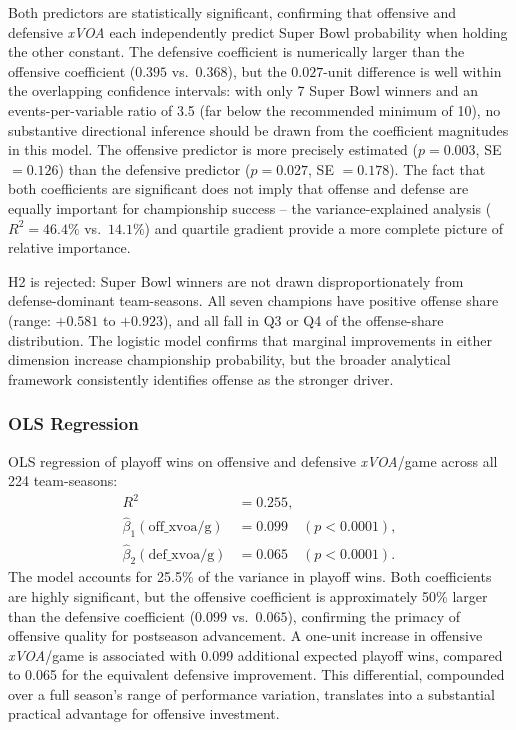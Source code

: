 \documentclass[12pt,a4paper]{article}
\newcommand{\xvoa}{\textit{xVOA}}
\begin{document}
Both predictors are statistically significant, confirming that offensive and defensive \xvoa{} each independently predict Super Bowl probability when holding the other constant. The defensive coefficient is numerically larger than the offensive coefficient ($0.395$ vs.\ $0.368$), but the $0.027$-unit difference is well within the overlapping confidence intervals: with only 7 Super Bowl winners and an events-per-variable ratio of 3.5 (far below the recommended minimum of 10), no substantive directional inference should be drawn from the coefficient magnitudes in this model. The offensive predictor is more precisely estimated ($p = 0.003$, SE $= 0.126$) than the defensive predictor ($p = 0.027$, SE $= 0.178$). The fact that both coefficients are significant does not imply that offense and defense are equally important for championship success -- the variance-explained analysis ($R^2 = 46.4\%$ vs.\ $14.1\%$) and quartile gradient provide a more complete picture of relative importance.

H2 is rejected: Super Bowl winners are not drawn disproportionately from defense-dominant team-seasons. All seven champions have positive offense share (range: $+0.581$ to $+0.923$), and all fall in Q3 or Q4 of the offense-share distribution. The logistic model confirms that marginal improvements in either dimension increase championship probability, but the broader analytical framework consistently identifies offense as the stronger driver.

\subsubsection{OLS Regression}

OLS regression of playoff wins on offensive and defensive \xvoa{}/game across all 224 team-seasons:
\begin{align*}
  R^2 &= 0.255, \\
  \hat{\beta}_1(\text{off\_xvoa/g}) &= 0.099 \quad (p < 0.0001), \\
  \hat{\beta}_2(\text{def\_xvoa/g}) &= 0.065 \quad (p < 0.0001).
\end{align*}
The model accounts for 25.5\% of the variance in playoff wins. Both coefficients are highly significant, but the offensive coefficient is approximately 50\% larger than the defensive coefficient ($0.099$ vs.\ $0.065$), confirming the primacy of offensive quality for postseason advancement. A one-unit increase in offensive \xvoa{}/game is associated with 0.099 additional expected playoff wins, compared to 0.065 for the equivalent defensive improvement. This differential, compounded over a full season's range of performance variation, translates into a substantial practical advantage for offensive investment.
\end{document}
